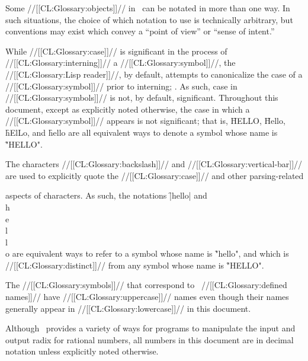 \endlist

\endsubsubsection%


Some //[[CL:Glossary:objects]]// in \clisp\ can be notated in more than one way. In such situations, the choice of which notation to use is technically arbitrary, but conventions may exist which convey a ``point of view'' or ``sense of intent.''

 

While //[[CL:Glossary:case]]// is significant in the process of //[[CL:Glossary:interning]]// a //[[CL:Glossary:symbol]]//, the //[[CL:Glossary:Lisp reader]]//, by default, attempts to canonicalize the case of a //[[CL:Glossary:symbol]]// prior to interning; \seesection\ReadtableCaseReadEffect. As such, case in //[[CL:Glossary:symbols]]// is not, by default, significant. Throughout this document, except as explicitly noted otherwise, the case in which a //[[CL:Glossary:symbol]]// appears is not significant;  that is, \f{HELLO}, \f{Hello}, \f{hElLo}, and \f{hello} are all equivalent ways to denote a symbol whose name is \f{"HELLO"}.

The characters //[[CL:Glossary:backslash]]// and //[[CL:Glossary:vertical-bar]]// are used to explicitly quote the //[[CL:Glossary:case]]// and other parsing-related 

aspects of characters.  As such, the notations \f{|hello|} and \f{\\h\\e\\l\\l\\o} are equivalent ways to refer to a symbol whose name is \f{"hello"}, and which is //[[CL:Glossary:distinct]]// from any symbol whose name is \f{"HELLO"}.

The //[[CL:Glossary:symbols]]// that correspond to \clisp\ //[[CL:Glossary:defined names]]// have //[[CL:Glossary:uppercase]]// names even though their names generally appear in //[[CL:Glossary:lowercase]]// in this document.

\endsubsubsubsection%


Although \clisp\ provides a variety of ways for programs to manipulate the input and output radix for rational numbers, all numbers in this document are in decimal notation unless explicitly noted otherwise.

